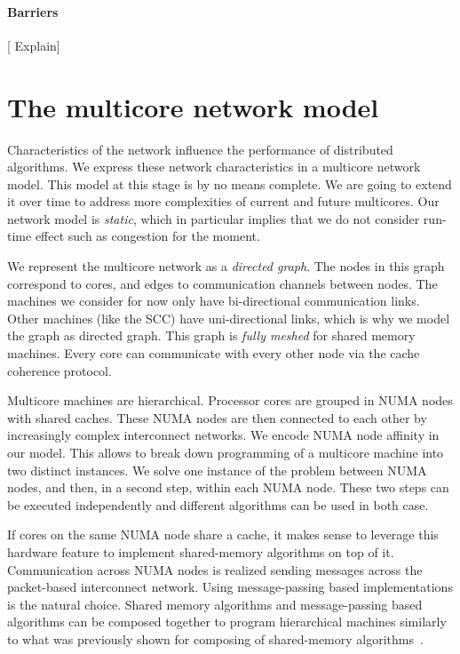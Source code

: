 \documentclass{article}
\newcommand{\stefan}[1]{
  {\color{skRed}[{\color{red}{SK}} #1]}}
\begin{document}
\paragraph{Barriers} \stefan{Explain}

\section{The multicore network model}
\label{sec:model}

Characteristics of the network influence the performance of
distributed algorithms. 
We express these network characteristics in a multicore network
model. This model at this stage is by no means complete. We are going to
extend it over time to address more complexities of current and future
multicores.
Our network model is \emph{static}, which in particular implies that
we do not consider run-time effect such as congestion for the moment.

We represent the multicore network as a \emph{directed graph}. The nodes in
this graph correspond to cores, and edges to communication channels
between nodes. The machines we consider for now only have
bi-directional communication links. Other machines (like the SCC) have
uni-directional links, which is why we model the graph as directed
graph.
This graph is \emph{fully meshed} for shared memory machines. Every core can
communicate with every other node via the cache coherence protocol.

Multicore machines are hierarchical. Processor cores are grouped in
NUMA nodes with shared caches. These NUMA nodes are then connected to
each other by increasingly complex interconnect networks. 
We encode NUMA node affinity in our model. This allows to break down
programming of a multicore machine into two distinct instances. We
solve one instance of the problem between NUMA nodes, and then, in a
second step, within each NUMA node. These two steps can be executed
independently and different algorithms can be used in both case.

If cores on the same NUMA node share a cache, it makes sense to
leverage this hardware feature to implement shared-memory algorithms
on top of it. %
Communication across NUMA nodes is realized sending messages across
the packet-based interconnect network. Using message-passing based
implementations is the natural choice. %
Shared memory algorithms and message-passing based algorithms can be
composed together to program hierarchical machines similarly to what
was previously shown for composing of shared-memory
algorithms~\cite{Alistarh2012}.
\end{document}
